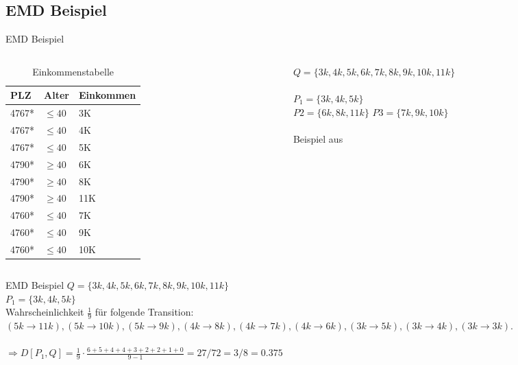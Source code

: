 \subsection{EMD Beispiel}\begin{frame} {EMD Beispiel}
	
	\begin{columns}[T]
		\begin{column}{0.5\textwidth}
			\begin{table}[]
				\centering
				\label{tclossenessExample}
				\begin{tabular}{|l|l|l|}
					\hline
					\textbf{PLZ}   & \textbf{Alter}    & \textbf{Einkommen} \\\hline
					4767* & $\le 40$ & 3K \\
					4767* & $\le 40$ & 4K \\
					4767* & $\le 40$ & 5K \\\hline
					4790* & $\ge 40$ & 6K \\
					4790* & $\ge 40$ & 8K \\
					4790* & $\ge 40$ & 11K \\\hline
					4760* & $\le 40$ & 7K \\
					4760* & $\le 40$ & 9K \\
					4760* & $\le 40$ & 10K \\\hline
				\end{tabular}
				\caption{Einkommenstabelle}
			\end{table}
		\end{column}
		
		\begin{column}{0.5\textwidth}
			$Q = \{3k, 4k, 5k, 6k, 7k, 8k, 9k, 10k, 11k\}$\\
			\ \\
			$P_1 = \{3k, 4k, 5k\}$ \\
			$P2 = \{6k, 8k, 11k\}$ 
			$P3 = \{7k, 9k, 10k\}$
			\ \\
			\ \\
			\tiny Beispiel aus \cite{Li2007t-closseness}
		\end{column}
	\end{columns}
\end{frame}
\begin{frame}{EMD Beispiel}
	$Q = \{3k, 4k, 5k, 6k, 7k, 8k, 9k, 10k, 11k\}$\\
	$P_1 = \{3k, 4k, 5k\}$ \\
	Wahrscheinlichkeit $\frac{1}{9}$ für folgende Transition:
	$(5k\rightarrow 11k), (5k\rightarrow 10k), (5k \rightarrow 9k),
	(4k \rightarrow 8k), (4k\rightarrow 7k), (4k \rightarrow 6k), (3k\rightarrow 5k), (3k\rightarrow 4k), (3k \rightarrow 3k).$\\
	\ \\
	$\Rightarrow D[P_1,Q]= \frac{1}{9} \cdot \frac{6 + 5 + 4 + 4 + 3 + 2 + 2 + 1 + 0}{9-1} = 27/72 = 3/8 = 0.375$
\end{frame}
